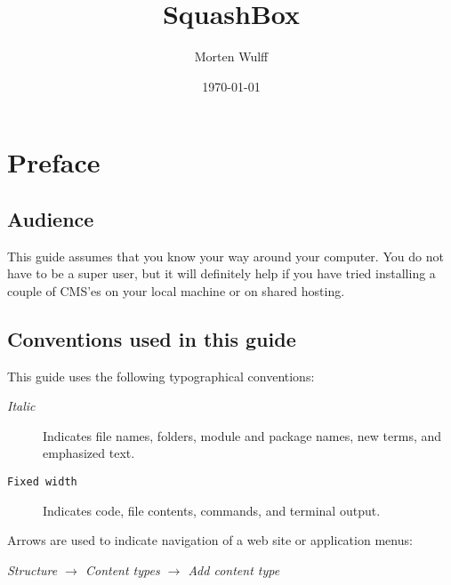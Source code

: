 \documentclass[ebook,10pt,twoside,openright]{memoir}
\title{SquashBox}
\author{Morten Wulff}
\date{\today}
\begin{document}
\frontmatter

\squashboxhalftitlepage{\thetitle}



\begingroup
{}
\tableofcontents*
\endgroup

\chapter{Preface}

\section*{Audience}

This guide assumes that you know your way around your computer. You do not have to be a super user, but it will definitely help if you have tried installing a couple of CMS'es on your local machine or on shared hosting.


\section*{Conventions used in this guide}

\begingroup
\setlength{\parindent}{0pt}

This guide uses the following typographical conventions:

\begin{description}
\item[\normalfont\emph{Italic}] Indicates file names, folders, module and package names, new terms, and emphasized text.
\item[\normalfont\texttt{Fixed width}] Indicates code, file contents, commands, and terminal output.
\end{description}

Arrows are used to indicate navigation of a web site or application menus:

\vspace{0.5\baselineskip}
\hspace{2\baselineskip}\emph{Structure $\rightarrow$ Content types $\rightarrow$ Add content type}
\vspace{0.5\baselineskip}
\end{document}
